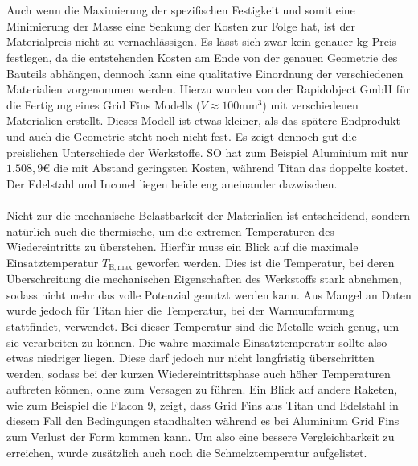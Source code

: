 \\~\\
Auch wenn die Maximierung der spezifischen Festigkeit und somit eine Minimierung der Masse eine Senkung der Kosten zur Folge hat, ist der Materialpreis nicht zu vernachlässigen. Es lässt sich zwar kein genauer kg-Preis festlegen, da die entstehenden Kosten am Ende von der genauen Geometrie des Bauteils abhängen, dennoch kann eine qualitative Einordnung der verschiedenen Materialien vorgenommen werden. Hierzu wurden von der Rapidobject GmbH für die Fertigung eines Grid Fins Modells ($V \approx 100\mathrm{mm}^3$) mit verschiedenen Materialien erstellt. Dieses Modell ist etwas kleiner, als das spätere Endprodukt und auch die Geometrie steht noch nicht fest. Es zeigt dennoch gut die preislichen Unterschiede der Werkstoffe.
SO hat zum Beispiel Aluminium mit nur $1.508,9$€ die mit Abstand geringsten Kosten, während Titan das doppelte kostet. Der Edelstahl und Inconel liegen beide eng aneinander dazwischen.
\\~\\
Nicht zur die mechanische Belastbarkeit der Materialien ist entscheidend, sondern natürlich auch die thermische, um die extremen Temperaturen des Wiedereintritts zu überstehen. Hierfür muss ein Blick auf die maximale Einsatztemperatur $T_\mathrm{E, max}$ geworfen werden. Dies ist die Temperatur, bei deren Überschreitung die mechanischen Eigenschaften des Werkstoffs stark abnehmen, sodass nicht mehr das volle Potenzial genutzt werden kann. Aus Mangel an Daten wurde jedoch für Titan hier die Temperatur, bei der Warmumformung stattfindet, verwendet. Bei dieser Temperatur sind die Metalle weich genug, um sie verarbeiten zu können. Die wahre maximale Einsatztemperatur sollte also etwas niedriger liegen. Diese darf jedoch nur nicht langfristig überschritten werden, sodass bei der kurzen Wiedereintrittsphase auch höher Temperaturen auftreten können, ohne zum Versagen zu führen. Ein Blick auf andere Raketen, wie zum Beispiel die Flacon 9, zeigt, dass Grid Fins aus Titan und Edelstahl in diesem Fall den Bedingungen standhalten während es bei Aluminium Grid Fins zum Verlust der Form kommen kann. Um also eine bessere Vergleichbarkeit zu erreichen, wurde zusätzlich auch noch die Schmelztemperatur aufgelistet.
